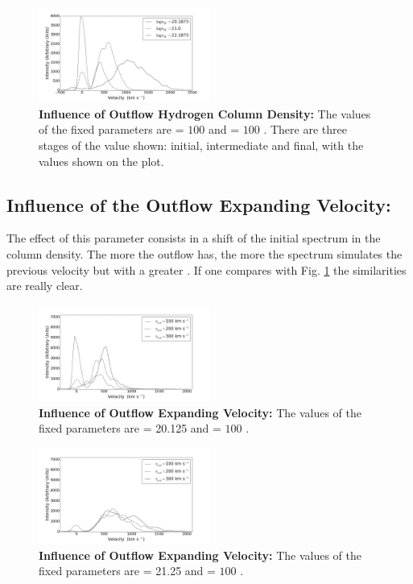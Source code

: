 \begin{figure}[h!]
	\begin{center}
		\includegraphics[width=0.5\textwidth]{./figures/inf_lognh_soft.png}
	\end{center}
	\caption{\textbf{Influence of Outflow Hydrogen Column Density:} The values of the fixed parameters are \vout = $100$ \kms and \vrot = $100$ \kms. There are three stages of the \lognh value shown: initial, intermediate and final, with the values shown on the plot.}
	\label{fig:influence_lognH}
\end{figure}

\subsection{Influence of the Outflow Expanding Velocity: \vout }

The effect of this parameter consists in a shift of the initial spectrum in the column density. The more \vout the outflow has, the more the spectrum simulates the previous velocity but with a greater \lognh. If one compares with Fig. \ref{fig:influence_lognH} the similarities are really clear. \\

\begin{figure}[h!]
	\begin{center}
		\includegraphics[width=0.5\textwidth]{./figures/inf_vout1_soft.png}
	\end{center}
	\caption{\textbf{Influence of Outflow Expanding Velocity:} The values of the fixed parameters are \lognh = 20.125 and \vrot = $100$ \kms.}
	\label{fig:influence_vout1}
\end{figure}

\begin{figure}[h!]
	\begin{center}
		\includegraphics[width=0.5\textwidth]{./figures/inf_vout2_soft.png}
	\end{center}
	\caption{\textbf{Influence of Outflow Expanding Velocity:} The values of the fixed parameters are \lognh = 21.25 and \vrot = $100$ \kms.}
	\label{fig:influence_vout2}
\end{figure}